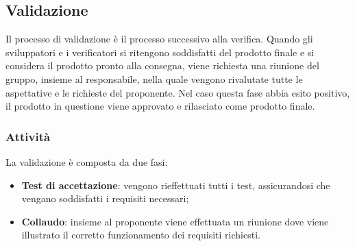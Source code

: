 \subsection{Validazione}
Il processo di validazione è il processo successivo alla verifica. Quando gli sviluppatori e i verificatori 
si ritengono soddisfatti del prodotto finale e si considera il prodotto pronto alla consegna, viene richiesta 
una riunione del gruppo, insieme al responsabile, nella quale vengono rivalutate tutte le aspettative e le 
richieste del proponente. Nel caso questa fase abbia esito positivo, il prodotto in questione viene approvato 
e rilasciato come prodotto finale.
\subsubsection{Attività}
La validazione è composta da due fasi:
\begin{itemize}
\item \textbf{Test di accettazione}: vengono rieffettuati tutti i test, assicurandosi che vengano soddisfatti 
i requisiti necessari;
\item \textbf{Collaudo}: insieme al proponente viene effettuata un riunione dove viene illustrato il corretto 
funzionamento dei requisiti richiesti. 
\end{itemize}
